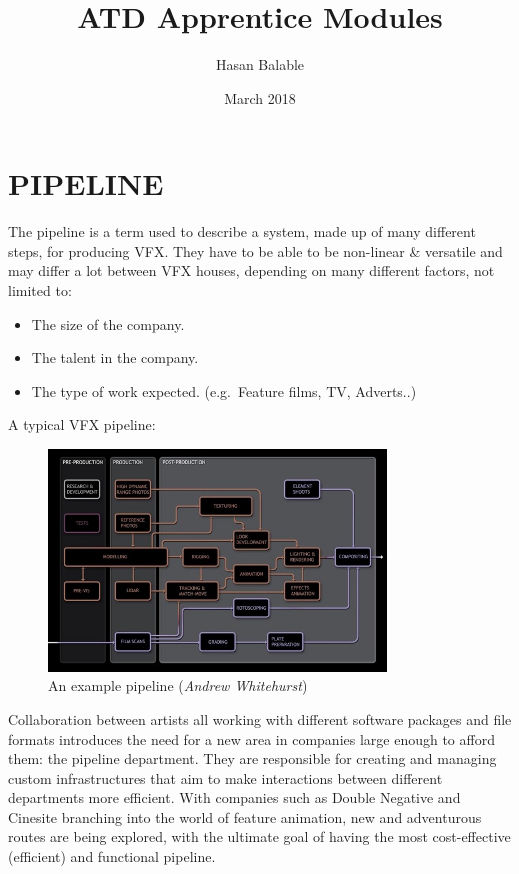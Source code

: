 \title{ATD Apprentice Modules}\author{Hasan Balable}\date{March 2018}\pagebreak\hypertarget{pipeline}{%
\section{PIPELINE}\label{pipeline}}

The pipeline is a term used to describe a system, made up of many different steps, for producing VFX. They have to be able to be non-linear \& versatile and may differ a lot between VFX houses, depending on many different factors, not limited to:

\begin{itemize}
\tightlist
\item
  The size of the company.
\item
  The talent in the company.
\item
  The type of work expected. (e.g.~Feature films, TV, Adverts..)
\end{itemize}

A typical VFX pipeline:

\begin{figure}
\includegraphics[width=0.8\textwidth,height=\textheight]{./images/andrew_whitehurst_pipeline.png}
\caption{An example pipeline (\emph{Andrew Whitehurst})}
\end{figure}

Collaboration between artists all working with different software packages and file formats introduces the need for a new area in companies large enough to afford them: the pipeline department. They are responsible for creating and managing custom infrastructures that aim to make interactions between different departments more efficient. With companies such as Double Negative and Cinesite branching into the world of feature animation, new and adventurous routes are being explored, with the ultimate goal of having the most cost-effective (efficient) and functional pipeline.

